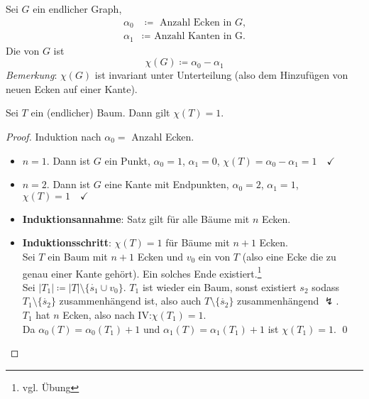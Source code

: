 \begin{definition}
  Sei \( G \) ein endlicher Graph,
  \begin{align*}
    \alpha_0 &\coloneqq \text{ Anzahl Ecken in } G\text{,} \\
    \alpha_1 &\coloneqq \text{ Anzahl Kanten in } \text{G.}
  \end{align*}
  Die \label{def:eulerCharakteristik} von \( G \) ist
  \begin{equation*}
    \chi(G) \coloneqq \alpha_0 - \alpha_1
  \end{equation*}
  \emph{Bemerkung}: \( \chi(G) \) ist invariant unter Unterteilung (also dem Hinzufügen von neuen Ecken auf einer Kante).
\end{definition}

\begin{theorem}
  Sei \( T \) ein (endlicher) Baum. Dann gilt \( \chi(T) = 1 \).
  \begin{proof}
    Induktion nach \( \alpha_0 = \) Anzahl Ecken.
    \begin{itemize}
      \item \( n = 1 \). Dann ist \( G \) ein Punkt, \( \alpha_0 = 1 \), \( \alpha_1 = 0 \), \( \chi(T) = \alpha_0 - \alpha_1 = 1 \quad \checkmark \)
      \item \( n = 2 \). Dann ist \( G \) eine Kante mit Endpunkten, \( \alpha_0 = 2 \), \( \alpha_1 = 1 \), \( \chi(T) = 1 \quad \checkmark \)
      \item \textbf{Induktionsannahme}: Satz gilt für alle Bäume mit \( n \) Ecken.
      \item \textbf{Induktionsschritt}: \( \chi(T) = 1 \) für Bäume mit \( n+1 \) Ecken. \\
        Sei \( T \) ein Baum mit \( n+1 \) Ecken und \( v_0 \) ein \label{def:blatt} von \( T \) (also eine Ecke die zu genau einer Kante gehört). Ein solches Ende existiert.\footnote{vgl. Übung} \\
        Sei \( \vert T_1 \vert \coloneqq \vert T \vert \setminus \{ \mathring{s_1} \cup v_0 \} \). \( T_1 \) ist wieder ein Baum, sonst existiert \( s_2 \) sodass \( T_1 \setminus \{ \mathring{s_2} \} \) zusammenhängend ist, also auch \( T \setminus \{ \mathring{s_2} \} \) zusammenhängend \( \lightning \). \\
        \( T_1 \) hat \( n \) Ecken, also nach IV:\@ \( \chi(T_1) = 1 \). \\
        Da \( \alpha_0(T) = \alpha_0(T_1) + 1 \) und \( \alpha_1(T) = \alpha_1(T_1) + 1 \) ist \( \chi(T_1) = 1 \). \qed{}
    \end{itemize}
  \end{proof}
\end{theorem}

